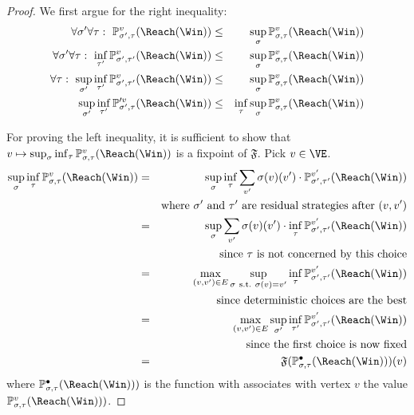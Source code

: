 \begin{proof}
We first argue for the right inequality:
\begin{eqnarray*}
\forall \sigma' \forall \tau:\
\probm_{\sigma',\tau}^v(\Reach(\Win)) & \le & \sup_\sigma
\probm_{\sigma,\tau}^v(\Reach(\Win)) \\
\forall \sigma'\forall \tau :\  \inf_{\tau'}
\probm_{\sigma',\tau'}^v(\Reach(\Win)) & \le & \sup_\sigma
\probm_{\sigma,\tau}^v(\Reach(\Win)) \\
\forall \tau:\ \sup_{\sigma'} \inf_{\tau'}
\probm_{\sigma',\tau'}^v(\Reach(\Win)) & \le & \sup_\sigma
\probm_{\sigma,\tau}^v(\Reach(\Win)) \\
\sup_{\sigma'} \inf_{\tau'}
\probm_{\sigma',\tau}'^v(\Reach(\Win)) & \le & \inf_{\tau} \sup_\sigma
\probm_{\sigma,\tau}^v(\Reach(\Win)) 
\end{eqnarray*}

For proving the left inequality, it is sufficient to show that
$v \mapsto \sup_\sigma \inf_\tau
\probm_{\sigma,\tau}^v(\Reach(\Win))$ is a fixpoint of
$\mathfrak{F}$.  Pick $v \in \VE$. 
\begin{eqnarray*}
\sup_\sigma \inf_\tau \probm_{\sigma,\tau}^v(\Reach(\Win)) & = &
\sup_\sigma \inf_\tau \sum_{v'} \sigma(v)(v')  \cdot
\probm_{\sigma',\tau'}^{v'}(\Reach(\Win)) \\
& & \text{where}\ \sigma'\ \text{and}\ \tau'\ \text{are residual strategies after}\ (v,v') \\
& = & \sup_\sigma \sum_{v'} \sigma(v)(v')  \cdot \inf_\tau \probm_{\sigma',\tau'}^{v'}(\Reach(\Win)) \\
& & \text{since}\ \tau\ \text{is not concerned by this choice}
\\
& = & \max_{(v,v') \in E} \sup_{\sigma\ \text{s.t.}\
\sigma(v) = v'} \inf_\tau
\probm_{\sigma',\tau'}^{v'}(\Reach(\Win)) \\
& & \text{since deterministic choices are the best} \\
& = & \max_{(v,v') \in E} \sup_{\sigma'} \inf_{\tau'}
\probm_{\sigma',\tau'}^{v'}(\Reach(\Win)) \\
& & \text{since the first choice is now fixed} \\
& = & \mathfrak{F}(\probm_{\sigma,\tau}^{\bullet}(\Reach(\Win)))(v)
\end{eqnarray*}
where $\probm_{\sigma,\tau}^{\bullet}(\Reach(\Win)))$ is the
function with associates with vertex $v$ the value
$\probm_{\sigma,\tau}^{v}(\Reach(\Win)))$.


\end{proof}
